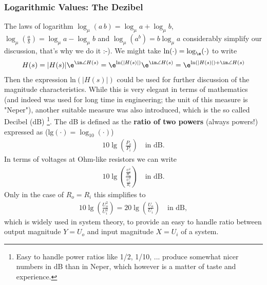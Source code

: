 \subsubsection{Logarithmic Values: The Dezibel}
The laws of logarithm $\log_\mu (a \, b) = \log_\mu a + \log_\mu b$,
$\log_\mu (\frac{a}{b}) = \log_\mu a - \log_\mu b$
and
$\log_\mu(a^b) = b \log_\mu a$
considerably simplify our discussion, that's why we do it :-).
%
We might take $\text{ln}(\cdot) = \log_\e(\cdot)$ to write
\begin{align}
H(s) = |H(s)| \e^{\im \angle H(s)} = \e^{\text{ln}(|H(s)|)} \e^{\im \angle H(s)}=
\e^{\text{ln}(|H(s)|)+\im \angle H(s)}
\end{align}
Then the expression $\text{ln}(|H(s)|)$ could be used for further discussion
of the magnitude characteristics.
%
While this is very elegant in terms of mathematics
(and indeed was used for long time in engineering; the unit of this
measure is "Neper"),
another suitable measure was also introduced, which is the so called Decibel (dB)
\footnote{Easy to handle power ratios like 1/2, 1/10, ... produce somewhat nicer numbers in dB
than in Neper, which however is a matter of taste and experience.}.
The dB is defined as the \textbf{ratio of two powers} (always powers!)
expressed as ($\text{lg}(\cdot) = \log_{10}(\cdot)$)
\begin{align}
  10 \lg (\frac{P_o}{P_i}) \quad \text{in dB}.
\end{align}
%
In terms of voltages at Ohm-like resistors we can write
\begin{align}
  10 \lg (\frac{\frac{U_o^2}{R_o}}{\frac{U_i^2}{R_i}}) \quad \text{in dB}.
\end{align}
Only in the case of $R_o = R_i$ this simplifies to
\begin{align}
  10 \lg (\frac{U^2_o}{U^2_i}) = 20 \lg (\frac{U_o}{U_i}) \quad \text{in dB},
\end{align}
which is widely used in system theory, to provide an easy to handle ratio between
output magnitude $Y=U_o$ and input magnitude $X=U_i$ of a system.

